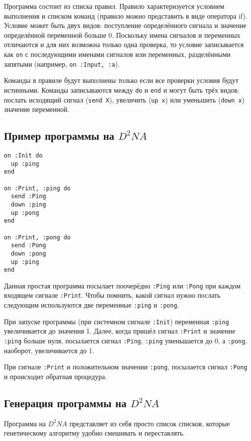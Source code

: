 \documentclass[utf8,a5paper,portrait,10pt,twoside]{eskdtext}
\begin{document}
Программа состоит из списка правил. Правило характеризуется условием выполнения
и списком команд (правило можно представить в виде оператора if). Условие может
быть двух видов: поступление определённого сигнала и значение определённой
переменной больше 0. Поскольку имена сигналов и переменных отличаются и для
них возможна только одна проверка, то условие записывается как \texttt{on} с
последующими именами сигналов или переменных, разделёнными запятыми (например,
\texttt{on~:Input, :a}).

Команды в правиле будут выполнены только если все проверки условия будут
истинными. Команды записываются между \texttt{do} и \texttt{end} и могут быть
трёх видов: послать исходящий сигнал (\texttt{send X}), увеличить
(\texttt{up~x}) или уменьшить (\texttt{down x}) значение переменной.

\subsection{Пример программы на $D^2NA$}
\begin{verbatim}
on :Init do
  up :ping
end

on :Print, :ping do
  send :Ping
  down :ping
  up :pong
end

on :Print, :pong do
  send :Pong
  down :pong
  up :ping
end
\end{verbatim}

Данная простая программа посылает поочерёдно \texttt{:Ping} или \texttt{:Pong}
при каждом входящем сигнале \texttt{:Print}. Чтобы помнить, какой сигнал нужно
послать следующим используются две переменные \texttt{:ping} и \texttt{:pong}.

При запуске программы (при системном сигнале \texttt{:Init}) переменная
\texttt{:ping} увеличивается до значения 1. Далее, когда пришёл сигнал
\texttt{:Print} и значение \texttt{:ping} больше нуля, посылается сигнал
\texttt{:Ping}, \texttt{:ping} уменьшается до 0, а \texttt{:pong}, наоборот,
увеличивается до 1.

При сигнале \texttt{:Print} и положительном значении \texttt{:pong}, посылается
сигнал \texttt{:Pong} и происходит обратная процедура.

\subsection{Генерация программы на $D^2NA$}
Программа на $D^2NA$ представляет из себя просто список списков, которые
генетическому алгоритму удобно смешивать и переставлять.
\end{document}
